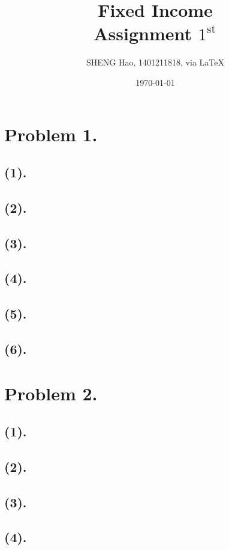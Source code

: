 \documentclass{article}
\begin{document}
\title{Fixed Income\\Assignment $1^{\text{st}}$}
\author{{\normalsize SHENG Hao, 1401211818, via \LaTeX}}
\date{\today}

\maketitle

\def \Pr{{\rm Pr}}
\baselineskip 0.6cm


\section{Problem 1.}
\subsection{(1).}
\subsection{(2).}
\subsection{(3).}
\subsection{(4).}
\subsection{(5).}
\subsection{(6).}
\section{Problem 2.}
\subsection{(1).}
\subsection{(2).}
\subsection{(3).}
\subsection{(4).}
\end{document}
